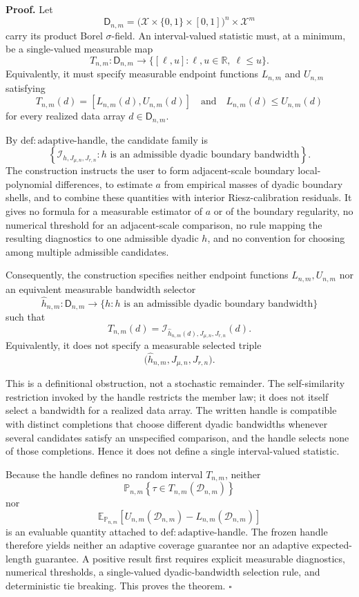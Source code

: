\textbf{Proof.}
Let
\[
\mathsf D_{n,m}
=\bigl(\mathcal X\times\{0,1\}\times[0,1]\bigr)^n\times\mathcal X^m
\]
carry its product Borel \(\sigma\)-field. An interval-valued statistic must, at a minimum, be a single-valued measurable map
\[
T_{n,m}:\mathsf D_{n,m}\longrightarrow
\bigl\{[\ell,u]:\ell,u\in\mathbb R,\ \ell\le u\bigr\}.
\]
Equivalently, it must specify measurable endpoint functions \(L_{n,m}\) and \(U_{n,m}\) satisfying
\[
T_{n,m}(d)=[L_{n,m}(d),U_{n,m}(d)]
\quad\text{and}\quad
L_{n,m}(d)\le U_{n,m}(d)
\]
for every realized data array \(d\in\mathsf D_{n,m}\).

By \(\mathrm{def:adaptive\text{-}handle}\), the candidate family is
\[
\left\{\mathcal I_{h,J_{\mu,n},J_{r,n}}:
h\text{ is an admissible dyadic boundary bandwidth}\right\}.
\]
The construction instructs the user to form adjacent-scale boundary local-polynomial differences, to estimate \(a\) from empirical masses of dyadic boundary shells, and to combine these quantities with interior Riesz-calibration residuals. It gives no formula for a measurable estimator of \(a\) or of the boundary regularity, no numerical threshold for an adjacent-scale comparison, no rule mapping the resulting diagnostics to one admissible dyadic \(h\), and no convention for choosing among multiple admissible candidates.

Consequently, the construction specifies neither endpoint functions \(L_{n,m},U_{n,m}\) nor an equivalent measurable bandwidth selector
\[
\widehat h_{n,m}:\mathsf D_{n,m}\longrightarrow
\{h:h\text{ is an admissible dyadic boundary bandwidth}\}
\]
such that
\[
T_{n,m}(d)
=\mathcal I_{\widehat h_{n,m}(d),J_{\mu,n},J_{r,n}}(d).
\]
Equivalently, it does not specify a measurable selected triple
\[
\bigl(\widehat h_{n,m},J_{\mu,n},J_{r,n}\bigr).
\]

This is a definitional obstruction, not a stochastic remainder. The self-similarity restriction invoked by the handle restricts the member law; it does not itself select a bandwidth for a realized data array. The written handle is compatible with distinct completions that choose different dyadic bandwidths whenever several candidates satisfy an unspecified comparison, and the handle selects none of those completions. Hence it does not define a single interval-valued statistic.

Because the handle defines no random interval \(T_{n,m}\), neither
\[
\mathbb P_{n,m}\!\left\{\tau\in T_{n,m}(\mathcal D_{n,m})\right\}
\]
nor
\[
\mathbb E_{\mathbb P_{n,m}}\!\left[
U_{n,m}(\mathcal D_{n,m})-L_{n,m}(\mathcal D_{n,m})
\right]
\]
is an evaluable quantity attached to \(\mathrm{def:adaptive\text{-}handle}\). The frozen handle therefore yields neither an adaptive coverage guarantee nor an adaptive expected-length guarantee. A positive result first requires explicit measurable diagnostics, numerical thresholds, a single-valued dyadic-bandwidth selection rule, and deterministic tie breaking. This proves the theorem. \(\square\)
